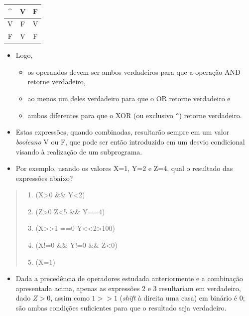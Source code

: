 \documentclass[12pt,a4paper]{article}
\providecommand{\tightlist}{%
      \setlength{\itemsep}{0pt}\setlength{\parskip}{0pt}}
\begin{document}
    \begin{longtable}[]{@{}ccc@{}}
\toprule()
\^{} & V & F \\
\midrule()
\endhead
V & F & V \\
F & V & F \\
\bottomrule()
\end{longtable}

    \begin{itemize}
\tightlist
\item
  Logo,

  \begin{itemize}
  \tightlist
  \item
    os operandos devem ser ambos verdadeiros para que a operação AND
    retorne verdadeiro,
  \item
    ao menos um deles verdadeiro para que o OR retorne verdadeiro e
  \item
    ambos diferentes para que o XOR (ou exclusivo \texttt{\^{}}) retorne
    verdadeiro.
  \end{itemize}
\end{itemize}

    \begin{itemize}
\item
  Estas expressões, quando combinadas, resultarão sempre em um valor
  \emph{booleano} V ou F, que pode ser então introduzido em um desvio
  condicional visando à realização de um subprograma.
\item
  Por exemplo, usando os valores X=1, Y=2 e Z=4, qual o resultado das
  expressões abaixo?
\end{itemize}

\begin{quote}
\begin{enumerate}
\def\labelenumi{\arabic{enumi}.}
\tightlist
\item
  (X\textgreater0 \&\& Y\textless2)
\item
  (Z\textgreater0 \textbar\textbar{} Z\textless5 \&\& Y==4)
\item
  (X\textgreater\textgreater1 ==0 \textbar\textbar{}
  Y\textless\textless2\textgreater100)
\item
  (X!=0 \&\& Y!=0 \&\& Z\textless0)
\item
  (X=1)
\end{enumerate}
\end{quote}

    \begin{itemize}
\tightlist
\item
  Dada a precedência de operadores estudada anteriormente e a combinação
  apresentada acima, apenas as expressões 2 e 3 resultariam em
  verdadeiro, dado \(Z>0\), assim como \(1>>1\) (\emph{shift} à direita
  uma casa) em binário é 0; são ambas condições suficientes para que o
  resultado seja verdadeiro.
\end{itemize}
\end{document}
